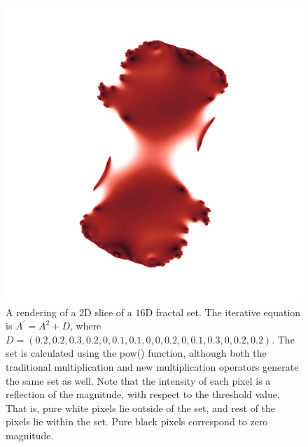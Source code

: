 \documentclass[12pt]{article}
\begin{document}
\begin{figure} 
\centering
  \includegraphics[width = 6 in]{16d_pow2.png}
  \caption{A rendering of a $2$D slice of a $16$D fractal set.
The iterative equation is $A^{\prime} = A^2 + D$, where $D = (0.2, 0.2, 0.3, 0.2, 0, 0.1, 0.1, 0, 0, 0.2, 0, 0.1, 0.3, 0, 0.2, 0.2)$.
The set is calculated using the pow() function, although both the traditional multiplication and new multiplication operators generate the same set as well.
Note that the intensity of each pixel is a reflection of the magnitude, with respect to the threshold value.
That is, pure white pixels lie outside of the set, and rest of the pixels lie within the set.
Pure black pixels correspond to zero magnitude.
}
\end{figure}
\end{document}
